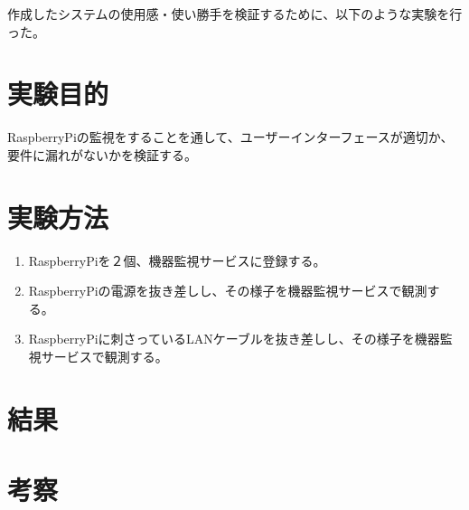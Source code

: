 作成したシステムの使用感・使い勝手を検証するために、以下のような実験を行った。
\section{実験目的}
	RaspberryPiの監視をすることを通して、ユーザーインターフェースが適切か、要件に漏れがないかを検証する。
\section{実験方法}
	\begin{enumerate}
		\item RaspberryPiを２個、機器監視サービスに登録する。
		\item RaspberryPiの電源を抜き差しし、その様子を機器監視サービスで観測する。
		\item RaspberryPiに刺さっているLANケーブルを抜き差しし、その様子を機器監視サービスで観測する。
	\end{enumerate}

\section{結果}

\section{考察}
